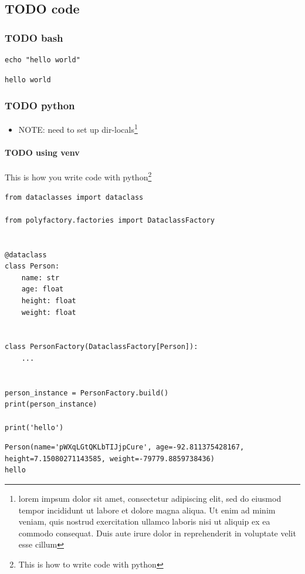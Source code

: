 \documentclass[11pt]{article}
\begin{document}
\subsection{{\bfseries\sffamily TODO} code}
\label{sec:org7567a1a}
\subsubsection{{\bfseries\sffamily TODO} bash}
\label{sec:org603edab}
\begin{verbatim}
echo "hello world"
\end{verbatim}

\label{org18aa17a}
\begin{verbatim}
hello world
\end{verbatim}
\subsubsection{{\bfseries\sffamily TODO} python}
\label{sec:org3497437}
\begin{itemize}
\item NOTE: need to set up dir-locals\footnote{lorem impsum dolor sit amet, consectetur adipiscing elit, sed do eiusmod tempor incididunt ut labore et dolore magna aliqua. Ut enim ad minim veniam, quis nostrud exercitation ullamco laboris nisi ut aliquip ex ea commodo consequat. Duis aute irure dolor in reprehenderit in voluptate velit esse cillum}
\end{itemize}
\paragraph{{\bfseries\sffamily TODO} using venv}
\label{sec:org77e10f5}
This is how you write code with python\footnote{This is how to write code with python}
\begin{verbatim}
from dataclasses import dataclass

from polyfactory.factories import DataclassFactory


@dataclass
class Person:
    name: str
    age: float
    height: float
    weight: float


class PersonFactory(DataclassFactory[Person]):
    ...


person_instance = PersonFactory.build()
print(person_instance)

print('hello')

\end{verbatim}

\begin{verbatim}
Person(name='pWXqLGtQKLbTIJjpCure', age=-92.811375428167, height=7.15080271143585, weight=-79779.8859738436)
hello
\end{verbatim}
\end{document}
